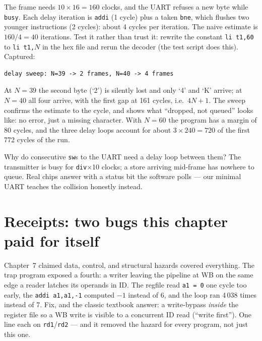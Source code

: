 \begin{example}
The frame needs \(10\times16=160\) clocks, and the UART refuses a new
byte while \texttt{busy}. Each delay iteration is
\texttt{addi} (1 cycle) plus a taken \texttt{bne}, which flushes two
younger instructions (2 cycles): about 4 cycles per iteration. The
naive estimate is \(160/4=40\) iterations. Test it rather than trust
it: rewrite the constant \texttt{li t1,60} to \texttt{li t1,}\(N\) in
the hex file and rerun the decoder (the test script does this). Captured:

\begin{verbatim}
delay sweep: N=39 -> 2 frames, N=40 -> 4 frames
\end{verbatim}

At \(N=39\) the second byte (`2') is silently lost and only `4' and
`K' arrive; at \(N=40\) all four arrive, with the first gap at 161
cycles, i.e.\ \(4N+1\). The sweep confirms the estimate to the cycle,
and shows what ``dropped, not queued'' looks like: no error, just a
missing character. With \(N=60\) the program has a margin of 80
cycles, and the three delay loops account for about
\(3\times240=720\) of the first 772 cycles of the run.
\end{example}

\begin{checkpoint}
Why do consecutive \texttt{sw}s to the UART need a delay loop between
them? The transmitter is busy for \texttt{div}$\times$10 clocks;
a store arriving mid-frame has nowhere to queue. Real chips answer
with a status bit the software polls --- our minimal UART teaches
the collision honestly instead.
\end{checkpoint}

\section{Receipts: two bugs this chapter paid for itself}
\label{sec:receipts08}

\begin{example}
Chapter~7 claimed data, control, and structural hazards covered
everything. The trap program exposed a fourth: a writer leaving the
pipeline at WB on the same edge a reader latches its operands in ID.
The regfile read \texttt{a1 = 0} one cycle too early, the
\texttt{addi a1,a1,-1} computed \(-1\) instead of \(6\), and the loop
ran 4\,038 times instead of 7. Fix, and the classic textbook answer:
a write-bypass \emph{inside} the register file so a WB write is
visible to a concurrent ID read (``write first''). One line each on
\texttt{rd1}/\texttt{rd2} --- and it removed the hazard for every
program, not just this one.
\end{example}

